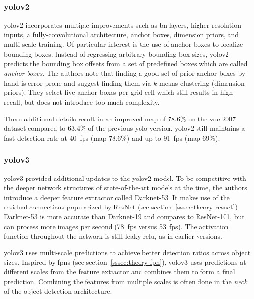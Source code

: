 \documentclass[draft,final]{vutinfth} %
\begin{document}
\subsubsection{\gls{yolo}v2}
\label{sssec:yolov2}

\gls{yolo}v2 \cite{redmon2017} incorporates multiple improvements such
as \gls{bn} layers, higher resolution inputs, a fully-convolutional
architecture, anchor boxes, dimension priors, and multi-scale
training. Of particular interest is the use of anchor boxes to
localize bounding boxes. Instead of regressing arbitrary bounding box
sizes, \gls{yolo}v2 predicts the bounding box offsets from a set of
predefined boxes which are called \emph{anchor boxes}. The authors
note that finding a good set of prior anchor boxes by hand is
error-prone and suggest finding them via $k$-means clustering
(dimension priors). They select five anchor boxes per grid cell which
still results in high recall, but does not introduce too much
complexity.

These additional details result in an improved \gls{map} of 78.6\% on
the \gls{voc} 2007 dataset compared to 63.4\% of the previous
\gls{yolo} version. \gls{yolo}v2 still maintains a fast detection rate
at \qty{40}{fps} (\gls{map} 78.6\%) and up to \qty{91}{fps} (\gls{map}
69\%).

\subsubsection{\gls{yolo}v3}
\label{sssec:yolov3}

\gls{yolo}v3 \cite{redmon2018} provided additional updates to the
\gls{yolo}v2 model. To be competitive with the deeper network
structures of state-of-the-art models at the time, the authors
introduce a deeper feature extractor called Darknet-53. It makes use
of the residual connections popularized by ResNet \cite{he2016} (see
section~\ref{sssec:theory-resnet}). Darknet-53 is more accurate than
Darknet-19 and compares to ResNet-101, but can process more images per
second (\qty{78}{fps} versus \qty{53}{fps}). The activation function
throughout the network is still leaky \gls{relu}, as in earlier
versions.

\gls{yolo}v3 uses multi-scale predictions to achieve better detection
ratios across object sizes. Inspired by \glspl{fpn} (see
section~\ref{sssec:theory-fpn}), \gls{yolo}v3 uses predictions at
different scales from the feature extractor and combines them to form
a final prediction. Combining the features from multiple scales is
often done in the \emph{neck} of the object detection architecture.
\end{document}
